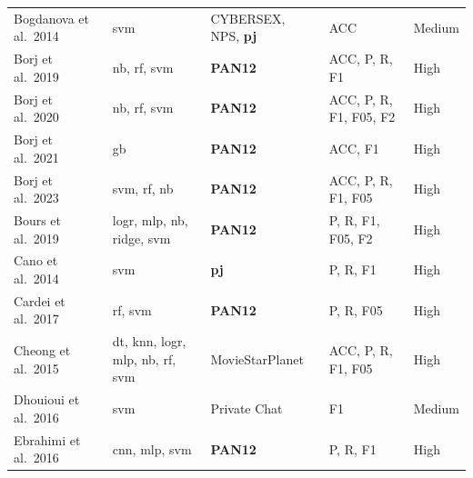 \documentclass[12pt,a4paper,oneside]{report}
\begin{document}
\begin{table}[ht]
\begin{tabular}{p{3.5cm} p{4.2cm} p{3.0cm} p{2.2cm} p{1.2cm}}
Bogdanova et al.\ 2014      & \acrshort{svm}                                                                                    & CYBERSEX, NPS, \textbf{\acrshort{pj}} & ACC                     & Medium \\
Borj et al.\ 2019           & \acrshort{nb}, \acrshort{rf}, \acrshort{svm}                                                      & \textbf{PAN12}                     & ACC, P, R, F1              & High   \\
Borj et al.\ 2020           & \acrshort{nb}, \acrshort{rf}, \acrshort{svm}                                                      & \textbf{PAN12}                     & ACC, P, R, F1, F05, F2     & High   \\
Borj et al.\ 2021           & \acrshort{gb}                                                                                     & \textbf{PAN12}                     & ACC, F1                    & High   \\
Borj et al.\ 2023           & \acrshort{svm}, \acrshort{rf}, \acrshort{nb}                                                      & \textbf{PAN12}                     & ACC, P, R, F1, F05         & High   \\
Bours et al.\ 2019          & \acrshort{logr}, \acrshort{mlp}, \acrshort{nb}, \acrshort{ridge}, \acrshort{svm}                  & \textbf{PAN12}                     & P, R, F1, F05, F2          & High   \\
Cano et al.\ 2014           & \acrshort{svm}                                                                                    & \textbf{\acrshort{pj}}             & P, R, F1                   & High   \\
Cardei et al.\ 2017         & \acrshort{rf}, \acrshort{svm}                                                                     & \textbf{PAN12}                     & P, R, F05                  & High   \\
Cheong et al.\ 2015         & \acrshort{dt}, \acrshort{knn}, \acrshort{logr}, \acrshort{mlp}, \acrshort{nb}, \acrshort{rf}, \acrshort{svm} & MovieStarPlanet          & ACC, P, R, F1, F05         & High   \\
Dhouioui et al.\ 2016       & \acrshort{svm}                                                                                    & Private Chat                       & F1                         & Medium \\
Ebrahimi et al.\ 2016       & \acrshort{cnn}, \acrshort{mlp}, \acrshort{svm}                                                    & \textbf{PAN12}                     & P, R, F1                   & High   \\

\end{tabular}
\end{table}
\end{document}
